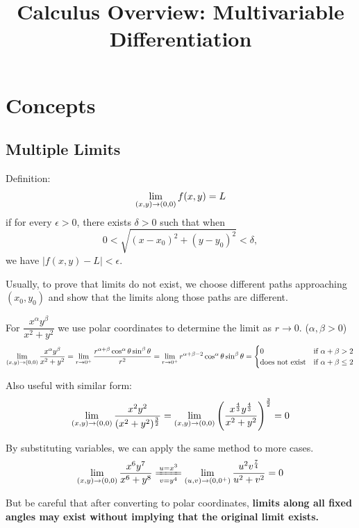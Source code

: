 \documentclass[a4]{overview}
\title{Calculus Overview: Multivariable Differentiation}
\begin{document}
\maketitle

\section{Concepts}

\subsection{Multiple Limits}

Definition:
\[
    \lim_{(x, y)\to(0, 0)} f(x,y) = L
\]
if for every $\epsilon > 0$, there exists $\delta > 0$ such that when
\[
    0 < \sqrt{(x-x_0)^2 + (y-y_0)^2} < \delta,
\]
we have $|f(x,y) - L| < \epsilon$.

Usually, to prove that limits do not exist,
we choose different paths approaching $(x_0,y_0)$ 
and show that the limits along those paths are different.

\begin{theorem}
\label{thm:xayb_over_x2y2_lim}
For $\dfrac{x^{\alpha}y^{\beta}}{x^2+y^2}$ we use polar coordinates to
determine the limit as $r \to 0$. ($\alpha, \beta>0$)
\[
	\lim_{(x, y)\to(0, 0)} \frac{x^{\alpha}y^{\beta}}{x^2+y^2}
	= \lim_{r \to 0^{+}} 
	\frac{r^{\alpha+\beta} \cos^{\alpha} \theta \sin^{\beta} \theta }{r^2}
	= \lim_{r \to 0^{+}} r^{\alpha+\beta-2} \cos^{\alpha} \theta \sin^{\beta} \theta
	= \begin{cases}
		0 & \text{if } \alpha + \beta > 2 \\
		\text{does not exist} & \text{if } \alpha + \beta \leq 2
	\end{cases}
	\]
\end{theorem}

\begin{example}
	Also useful with similar form:
	\[
		\lim_{(x, y)\to(0, 0)} \frac{x^2y^2}{(x^2+y^2)^{\frac{3}{2}}}
		= \lim_{(x, y)\to(0, 0)} \left( \frac{x^{\frac{4}{3}}y^{\frac{4}{3}}}{x^2+y^2} \right)^{\frac{3}{2}}
		= 0
	\] 
\end{example}

\begin{example}
	By substituting variables, we can apply the same method to more cases.
	\[
		\lmxyoo \frac{x^{6}y^{7}}{x^{6}+y^{8}}
		\xlongequal[v=y^4]{u=x^3}
		\jlm{u}{v}{0}{0^{+}} \frac{u^2v^{\frac{7}{4}}}{u^2+v^2}
	=0
	\] 
\end{example}

But be careful that after converting to polar coordinates, \textbf{limits along
all fixed angles may exist without implying that the original limit exists.}
\end{document}
